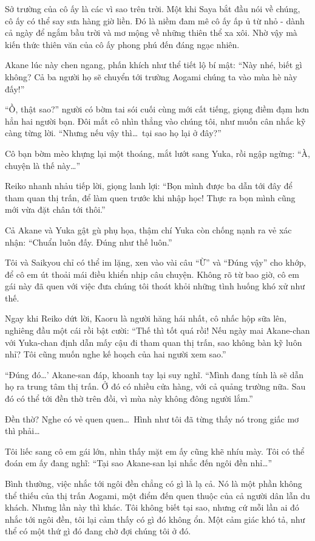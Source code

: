 \documentclass[../main.tex]{subfiles}
\begin{document}
Sở trường của cô ấy là các vì sao trên trời. Một khi Saya bắt đầu nói về chúng, cô ấy có thể say sưa hàng giờ liền. Đó là niềm đam mê cô ấy ấp ủ từ nhỏ - dành cả ngày để ngắm bầu trời và mơ mộng về những thiên thể xa xôi. Nhờ vậy mà kiến thức thiên văn của cô ấy phong phú đến đáng ngạc nhiên.

\chrint

Akane lúc này chen ngang, phấn khích như thể tiết lộ bí mật: ``Này nhé, biết gì không? Cả ba người họ sẽ chuyển tới trường Aogami chúng ta vào mùa hè này đấy!''

``Ồ, thật sao?'' người có bờm tai sói cuối cùng mới cất tiếng, giọng điềm đạm hơn hẳn hai người bạn. Đôi mắt cô nhìn thẳng vào chúng tôi, như muốn cân nhắc kỹ càng từng lời. ``Nhưng nếu vậy thì\dots\ tại sao họ lại ở đây?''

Cô bạn bờm mèo khựng lại một thoáng, mắt lướt sang Yuka, rồi ngập ngừng: ``À, chuyện là thế này\dots''

Reiko nhanh nhảu tiếp lời, giọng lanh lợi: ``Bọn mình được ba dẫn tới đây để tham quan thị trấn, để làm quen trước khi nhập học! Thực ra bọn mình cũng mới vừa đặt chân tới thôi.''

Cả Akane và Yuka gật gù phụ họa, thậm chí Yuka còn chống nạnh ra vẻ xác nhận: ``Chuẩn luôn đấy. Đúng như thế luôn.''

Tôi và Saikyou chỉ có thể im lặng, xen vào vài câu ``Ừ'' và ``Đúng vậy'' cho khớp, để cô em út thoải mái điều khiển nhịp câu chuyện. Không rõ từ bao giờ, cô em gái này đã quen với việc đưa chúng tôi thoát khỏi những tình huống khó xử như thế.

Ngay khi Reiko dứt lời, Kaoru là người hăng hái nhất, cô nhấc hộp sữa lên, nghiêng đầu một cái rồi bật cười: ``Thế thì tốt quá rồi! Nếu ngày mai Akane-chan với Yuka-chan định dẫn mấy cậu đi tham quan thị trấn, sao không bàn kỹ luôn nhỉ? Tôi cũng muốn nghe kế hoạch của hai người xem sao.''

``Đúng đó\dots' Akane-san đáp, khoanh tay lại suy nghĩ. ``Mình đang tính là sẽ dẫn họ ra trung tâm thị trấn. Ở đó có nhiều cửa hàng, với cả quảng trường nữa. Sau đó có thể tới đền thờ trên đồi, vì mùa này không đông người lắm.''

Đền thờ? Nghe có vẻ quen quen\dots\ Hình như tôi đã từng thấy nó trong giấc mơ thì phải\dots

Tôi liếc sang cô em gái lớn, nhìn thấy mặt em ấy cũng khẽ nhíu mày. Tôi có thể đoán em ấy đang nghĩ: ``Tại sao Akane-san lại nhắc đến ngôi đền nhỉ\dots''

Bình thường, việc nhắc tới ngôi đền chẳng có gì là lạ cả. Nó là một phần không thể thiếu của thị trấn Aogami, một điểm đến quen thuộc của cả người dân lẫn du khách. Nhưng lần này thì khác. Tôi không biết tại sao, nhưng cứ mỗi lần ai đó nhắc tới ngôi đền, tôi lại cảm thấy có gì đó không ổn. Một cảm giác khó tả, như thể có một thứ gì đó đang chờ đợi chúng tôi ở đó.
\end{document}
